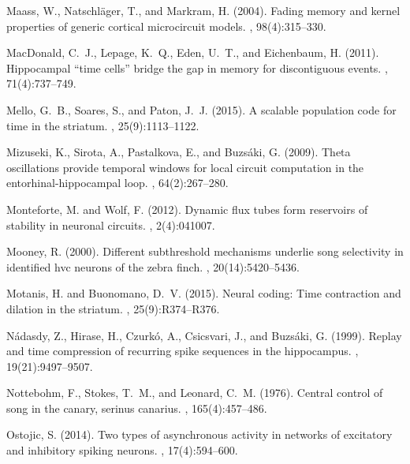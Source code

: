 \documentclass[11pt]{article} %
\begin{document}
\begin{thebibliography}{10}
Maass, W., Natschl{\"a}ger, T., and Markram, H. (2004).
\newblock Fading memory and kernel properties of generic cortical microcircuit
  models.
, 98(4):315--330.

MacDonald, C.~J., Lepage, K.~Q., Eden, U.~T., and Eichenbaum, H. (2011).
\newblock Hippocampal “time cells” bridge the gap in memory for
  discontiguous events.
, 71(4):737--749.

Mello, G.~B., Soares, S., and Paton, J.~J. (2015).
\newblock A scalable population code for time in the striatum.
, 25(9):1113--1122.

Mizuseki, K., Sirota, A., Pastalkova, E., and Buzs{\'a}ki, G. (2009).
\newblock Theta oscillations provide temporal windows for local circuit
  computation in the entorhinal-hippocampal loop.
, 64(2):267--280.

Monteforte, M. and Wolf, F. (2012).
\newblock Dynamic flux tubes form reservoirs of stability in neuronal circuits.
, 2(4):041007.

Mooney, R. (2000).
\newblock Different subthreshold mechanisms underlie song selectivity in
  identified hvc neurons of the zebra finch.
, 20(14):5420--5436.

Motanis, H. and Buonomano, D.~V. (2015).
\newblock Neural coding: Time contraction and dilation in the striatum.
, 25(9):R374--R376.

N{\'a}dasdy, Z., Hirase, H., Czurk{\'o}, A., Csicsvari, J., and Buzs{\'a}ki, G.
  (1999).
\newblock Replay and time compression of recurring spike sequences in the
  hippocampus.
, 19(21):9497--9507.

Nottebohm, F., Stokes, T.~M., and Leonard, C.~M. (1976).
\newblock Central control of song in the canary, serinus canarius.
, 165(4):457--486.

Ostojic, S. (2014).
\newblock Two types of asynchronous activity in networks of excitatory and
  inhibitory spiking neurons.
, 17(4):594--600.


\end{thebibliography}
\end{document}
